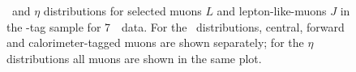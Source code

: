 \begin{figure}[h!]
{        }
    \caption[\pt\ and $\eta$ distributions for selected muons $L$ and
    muons-like-jets $J$ in the \Z-tag sample for 7~\tev\ data.]
    {\small \pt\ and $\eta$ distributions for selected muons $L$ and
    lepton-like-muons $J$ in the \Z-tag sample for 7~\tev\ data. 
    For the \pt\ distributions, central, forward and calorimeter-tagged muons are shown
    separately; for the $\eta$ distributions all muons are
    shown in the same plot.}
\label{fig:ljdist-mu-seven} 
\end{figure}

